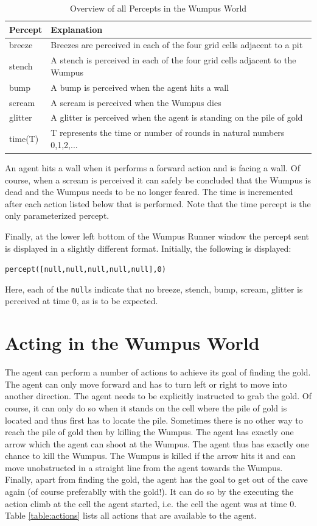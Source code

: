\documentclass{article}
\begin{document}
\begin{table}[h]
\centering
\begin{tabular}{ll}
\hline
\textbf{Percept} & \textbf{Explanation}\\
\hline
breeze & Breezes are perceived in each of the four grid cells adjacent to a
pit\\
stench & A stench is perceived in each of the four grid cells adjacent to the
Wumpus\\
bump & A bump is perceived when the agent hits a wall\\
scream & A scream is perceived when the Wumpus dies\\
glitter & A glitter is perceived when the agent is standing on the pile of
gold\\
time(T) & T represents the time or number of rounds in natural numbers 
0,1,2,...\\
\hline
\end{tabular}
\caption{Overview of all Percepts in the Wumpus World}\label{table:percepts}
\end{table}

An agent hits a wall when it performs a forward action and is facing a wall.
Of course, when a scream is perceived it can safely be concluded that the Wumpus
is dead and the Wumpus needs to be no longer feared. The time is incremented
after each action listed below that is performed. Note that the time percept is
the only parameterized percept.

Finally, at the lower left bottom of the Wumpus Runner window the percept sent
is displayed in a slightly different format. Initially, the following is
displayed:
\begin{center}
\verb|percept([null,null,null,null,null],0)|
\end{center}
Here, each of the \verb|null|s indicate that no breeze, stench, bump, scream,
glitter is perceived at time 0, as is to be expected.


%
%
%
\section{Acting in the Wumpus World}
%
The agent can perform a number of actions to achieve its goal of finding the
gold. The agent can only move forward and has to turn left or right to move into
another direction. The agent needs to be explicitly instructed to grab the gold.
Of course, it can only do so when it stands on the cell where the pile of gold
is located and thus first has to locate the pile. Sometimes there is no other
way to reach the pile of gold then by killing the Wumpus. The agent has
exactly one arrow which the agent can shoot at the Wumpus. The agent thus has
exactly one chance to kill the Wumpus. The Wumpus is killed if the arrow hits
it and can move unobstructed in a straight line from the agent towards the
Wumpus. Finally, apart from finding the gold, the agent has the goal to get out
of the cave again (of course preferablly with the gold!). It can do so by the
executing the action climb at the cell the agent started, i.e. the cell the
agent was at time 0. Table \ref{table:actions} lists all actions that are available to the
agent.
\end{document}
